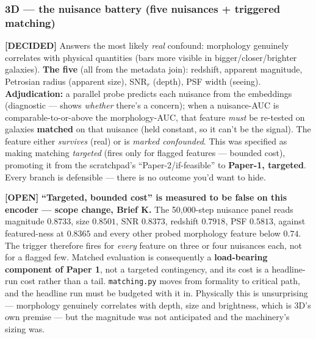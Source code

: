 \documentclass[11pt,a4paper]{article}
\newcommand{\dec}{\textcolor{decided}{\sffamily\bfseries[DECIDED]}}
\newcommand{\opn}{\textcolor{openq}{\sffamily\bfseries[OPEN]}}
\begin{document}
\subsubsection{3D --- the nuisance battery (five nuisances + triggered matching)}
\dec{} Answers the most likely \emph{real} confound: morphology genuinely correlates with
physical quantities (bars more visible in bigger/closer/brighter galaxies). \textbf{The five}
(all from the metadata join): redshift, apparent magnitude, Petrosian radius (apparent size),
SNR$_r$ (depth), PSF width (seeing). \textbf{Adjudication:} a parallel probe predicts each
nuisance from the embeddings (diagnostic --- shows \emph{whether} there's a concern); when a
nuisance-AUC is comparable-to-or-above the morphology-AUC, that feature \emph{must} be re-tested
on galaxies \textbf{matched} on that nuisance (held constant, so it can't be the signal). The
feature either \emph{survives} (real) or is \emph{marked confounded}. This was specified as making
matching \emph{targeted} (fires only for flagged features --- bounded cost), promoting it from the
scratchpad's ``Paper-2/if-feasible'' to \textbf{Paper-1, targeted}. Every branch is defensible ---
there is no outcome you'd want to hide.

\opn{} \textbf{``Targeted, bounded cost'' is measured to be false on this encoder --- scope change,
Brief K.} The 50{,}000-step nuisance panel reads magnitude $0.8733$, size $0.8501$,
SNR $0.8373$, redshift $0.7918$, PSF $0.5813$, against featured-ness at $0.8365$ and every other
probed morphology feature below $0.74$. The trigger therefore fires for \emph{every} feature on
three or four nuisances each, not for a flagged few. Matched evaluation is consequently a
\textbf{load-bearing component of Paper 1}, not a targeted contingency, and its cost is a
headline-run cost rather than a tail. \texttt{matching.py} moves from formality to critical path,
and the headline run must be budgeted with it in. Physically this is unsurprising --- morphology
genuinely correlates with depth, size and brightness, which is 3D's own premise --- but the
magnitude was not anticipated and the machinery's sizing was.
\end{document}
